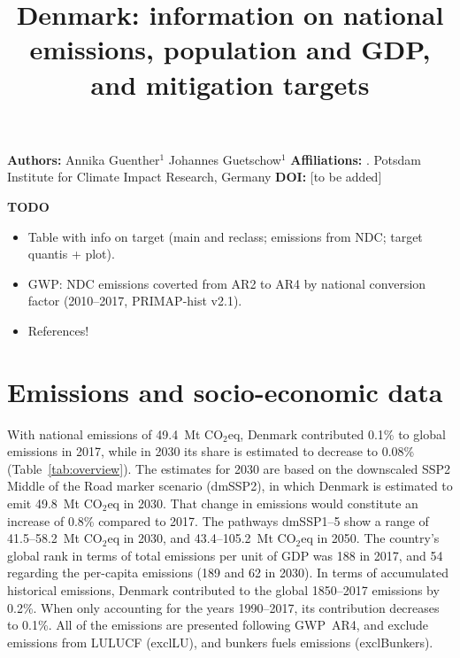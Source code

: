 \documentclass[12pt]{article}
\title{ \bfseries \color{PIKorange} Denmark: information on national emissions, population and GDP, and mitigation targets}
\begin{document}
 \maketitle

 \noindent \textbf{Authors:} \newline
 \indent Annika Guenther$^{1}$ \newline
 \indent Johannes Guetschow$^{1}$ \newline
 \noindent \textbf{Affiliations:} \newline
 . Potsdam Institute for Climate Impact Research, Germany \newline
 \noindent \textbf{DOI:} [to be added] \newline

 \textbf{TODO}
 \begin{itemize}
 \item Table with info on target (main and reclass; emissions from NDC; target quantis + plot).
 \item GWP: NDC emissions coverted from AR2 to AR4 by national conversion factor (2010--2017, PRIMAP-hist v2.1).
 \item References!
 \end{itemize}

 \newpage %
 \section{Emissions and socio-economic data}
 \label{sec:nonLULUCFSocioEco}
 With national emissions of 49.4~Mt CO$_2$eq, Denmark contributed 0.1\% to global emissions in 2017, while in 2030 its share is estimated to decrease to 0.08\% (Table~\ref{tab:overview}).
 The estimates for 2030 are based on the downscaled SSP2 Middle of the Road marker scenario (dmSSP2), in which Denmark is estimated to emit 49.8~Mt CO$_2$eq in 2030.
 That change in emissions would constitute an increase of 0.8\% compared to 2017. 
 The pathways dmSSP1--5 show a range of 41.5--58.2~Mt CO$_2$eq in 2030, and 43.4--105.2~Mt CO$_2$eq in 2050.
 The country's global rank in terms of total emissions per unit of GDP was 188 in 2017, and 54 regarding the per-capita emissions (189 and 62 in 2030).
 In terms of accumulated historical emissions, Denmark contributed to the global 1850--2017 emissions by 0.2\%. 
 When only accounting for the years 1990--2017, its contribution decreases to 0.1\%.
 All of the emissions are presented following GWP~AR4, and exclude emissions from LULUCF (exclLU), and bunkers fuels emissions (exclBunkers).
\end{document}
